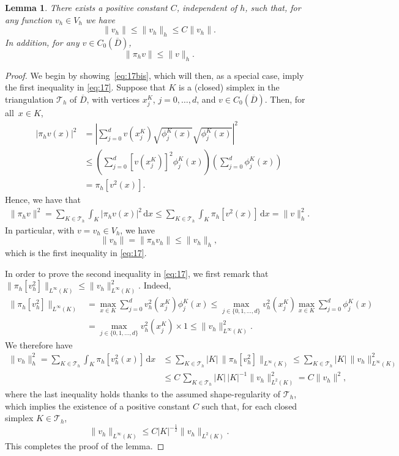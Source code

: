 \documentclass[12pt]{article}
\newtheorem{lemma}{Lemma}[section]
\newcommand{\dd}{\,\mathrm{d}}
\begin{document}
{\begin{lemma}\label{L2-h-norm-comparison}
There exists a positive constant $C$, independent of $h$, such that, for any function $v_h  \in V_h$ we have
     \begin{equation}\label{eq:17}
                \|v_h\|   \leq \|v_h\|_h \leq C \|v_h\|.  
    \end{equation}
In addition,  for any $v \in C_0(\overline{D})$, 
  \begin{equation}\label{eq:17bis}
  \|\pi_h v\| \leq \|v\|_h.
  \end{equation}
\end{lemma}
\begin{proof}
%
We begin by showing~\eqref{eq:17bis}, which will then, as a special case, imply the first inequality in \eqref{eq:17}.
Suppose that $K$ is a (closed) simplex in the triangulation $\mathcal{T}_h$ of $\overline{D}$, with vertices $x^K_j$, $j=0,\ldots,d$, and $v \in C_0(\overline{D})$. Then, for all~$x \in K$,
%
\begin{align*}
|\pi_hv(x)|^2 &=   \left| \sum_{j=0}^d v(x^K_j) \sqrt{\phi^K_j(x)} \sqrt{\phi^K_j(x)} \right|^2 \\
&\leq \left( \sum_{j=0}^d [v(x^K_j)]^2 \phi^K_j(x)\right) \left( \sum_{j=0}^d \phi^K_j(x)\right)  \\
&= \pi_h[v^2(x)].
\end{align*}
%
Hence, we have that 
%
\begin{align*}
\|\pi_h v\|^2   = \sum_{K \in \mathcal{T}_h}\int_K |\pi_h v(x)|^2 \dd x  \leq    \sum_{K \in \mathcal{T}_h}\int_K \pi_h [v^2(x)] \dd x =   \|v\|^2_h. 
\end{align*}
In particular, with $v= v_h \in {V}_h$, we have  
%
\[ \|v_h\|   = \|\pi_h v_h\|   \leq \|v_h\|_h, \]
%
which is the first inequality in \eqref{eq:17}. 

In order to prove the second inequality in \eqref{eq:17}, we first remark that 
$\|\pi_h [v_h^2]\|_{L^\infty(K)} \leq \|v_h\|^2_{L^\infty(K)}$. Indeed, 
%
\begin{align*}
\|\pi_h[v_h^2]\|_{L^\infty(K)} &= \max_{x \in K} \sum_{j=0}^d v_h^2(x_j^K) \phi_j^K(x)   \leq \max_{j \in \{0,1,\ldots,d\}} v_h^2(x_j^K)\max_{x \in K} \sum_{j=0}^d \phi_j^K(x)\\ &=  \max_{j \in \{0,1,\ldots,d\}} v_h^2(x_j^K) \times 1 \leq \|v_h\|^2_{L^\infty(K)}. 
\end{align*}
We therefore have 
\begin{align*}
\|v_h\|^2_h = \sum_{K \in \mathcal{T}_h} \int_K \pi_h[v_h^2(x)] \dd x & \leq \sum_{K \in \mathcal{T}_h} |K|\, \|\pi_h[v_h^2]\|_{L^\infty(K)} \leq \sum_{K \in \mathcal{T}_h} |K|\, \|v_h\|^2_{L^\infty(K)}\\
&\leq C\,\sum_{K \in \mathcal{T}_h} |K|\, |K|^{-1} \|v_h\|^2_{L^2(K)} = C\|v_h\|^2,
\end{align*}
where the last inequality holds thanks to the assumed shape-regularity of $\mathcal{T}_h$, which implies the existence of  a positive constant $C$ such that, for each closed  simplex $K \in \mathcal{T}_h$,
%
\[\|v_h\|_{L^\infty(K)} \leq C |K|^{-\frac{1}{2}}\|v_h\|_{L^2(K)}.\]
%
This completes the proof of the lemma. 
\end{proof}

}
\end{document}
